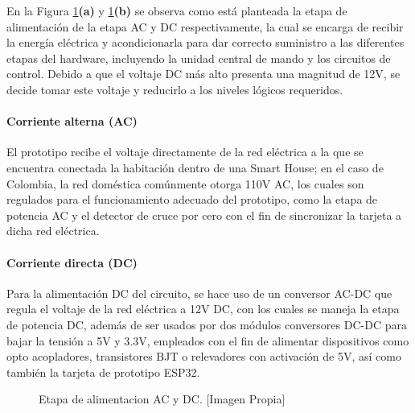 	En la Figura \ref{fig:balidc}\textbf{(a)} y \ref{fig:balidc}\textbf{(b)} se observa como está planteada la etapa de alimentación de la etapa AC y DC respectivamente, la cual se encarga de recibir la energía eléctrica y acondicionarla para dar correcto suministro a las diferentes etapas del hardware, incluyendo la unidad central de mando y los circuitos de control. Debido a que el voltaje DC más alto presenta una magnitud de 12V, se decide tomar este voltaje y reducirlo a los niveles lógicos requeridos. \\
	
	\paragraph{Corriente alterna (AC)}
		El prototipo recibe el voltaje directamente de la red eléctrica a la que se encuentra conectada la habitación dentro de una Smart House; en el caso de Colombia, la red doméstica comúnmente otorga 110V AC, los cuales son regulados para el funcionamiento adecuado del prototipo, como la etapa de potencia AC y el detector de cruce por cero con el fin de sincronizar la tarjeta a dicha red eléctrica.\\
	
	\paragraph{Corriente directa (DC)}
	Para la alimentación DC del circuito, se hace uso de un conversor AC-DC que regula el voltaje de la red eléctrica a 12V DC, con los cuales se maneja la etapa de potencia DC, además de ser usados por dos módulos conversores DC-DC para bajar la tensión a 5V y 3.3V, empleados con el fin de alimentar dispositivos como opto acopladores, transistores BJT o relevadores con activación de 5V, así como también la tarjeta de prototipo ESP32.\\
	
		\begin{figure}[!t]
			\centering
			\caption[Etapa de alimentacion AC y DC.]{Etapa de alimentacion AC y DC. [Imagen Propia]}
			\label{fig:balidc}
		\end{figure}
	
